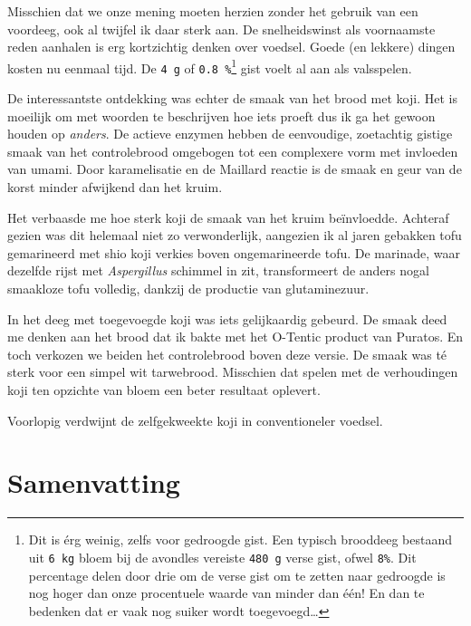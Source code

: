 \documentclass[
  11pt,
  dutch,
]{memoir}
\begin{document}
Misschien dat we onze mening moeten herzien zonder het gebruik van een
voordeeg, ook al twijfel ik daar sterk aan. De snelheidswinst als
voornaamste reden aanhalen is erg kortzichtig denken over voedsel. Goede
(en lekkere) dingen kosten nu eenmaal tijd. De \texttt{4\ g} of
\texttt{0.8\ \%}\footnote{Dit is érg weinig, zelfs voor gedroogde gist.
  Een typisch brooddeeg bestaand uit \texttt{6\ kg} bloem bij de
  avondles vereiste \texttt{480\ g} verse gist, ofwel \texttt{8\%}. Dit
  percentage delen door drie om de verse gist om te zetten naar
  gedroogde is nog hoger dan onze procentuele waarde van minder dan één!
  En dan te bedenken dat er vaak nog suiker wordt toegevoegd\ldots{}}
gist voelt al aan als valsspelen.

De interessantste ontdekking was echter de smaak van het brood met koji.
Het is moeilijk om met woorden te beschrijven hoe iets proeft dus ik ga
het gewoon houden op \emph{anders}. De actieve enzymen hebben de
eenvoudige, zoetachtig gistige smaak van het controlebrood omgebogen tot
een complexere vorm met invloeden van umami. Door karamelisatie en de
Maillard reactie is de smaak en geur van de korst minder afwijkend dan
het kruim.

Het verbaasde me hoe sterk koji de smaak van het kruim beïnvloedde.
Achteraf gezien was dit helemaal niet zo verwonderlijk, aangezien ik al
jaren gebakken tofu gemarineerd met shio koji verkies boven
ongemarineerde tofu. De marinade, waar dezelfde rijst met
\emph{Aspergillus} schimmel in zit, transformeert de anders nogal
smaakloze tofu volledig, dankzij de productie van glutaminezuur.

In het deeg met toegevoegde koji was iets gelijkaardig gebeurd. De smaak
deed me denken aan het brood dat ik bakte met het O-Tentic product van
Puratos. En toch verkozen we beiden het controlebrood boven deze versie.
De smaak was té sterk voor een simpel wit tarwebrood. Misschien dat
spelen met de verhoudingen koji ten opzichte van bloem een beter
resultaat oplevert.

Voorlopig verdwijnt de zelfgekweekte koji in conventioneler voedsel.

\newpage

\hypertarget{samenvatting-1}{%
\section{Samenvatting}\label{samenvatting-1}}
\end{document}
